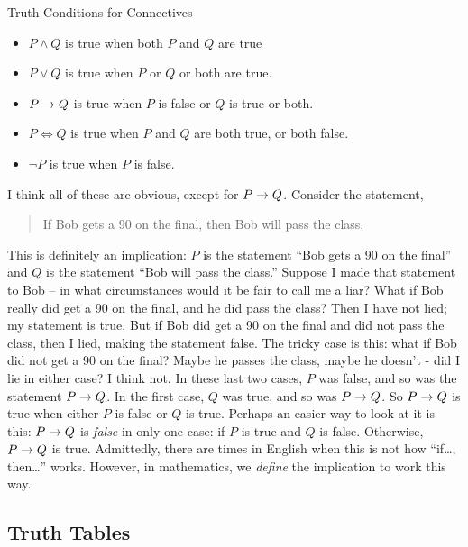 \documentclass[12pt]{article}
\begin{document}
\begin{defbox}{Truth Conditions for Connectives}
\begin{itemize}
 \item $P \wedge Q$ is true when both $P$ and $Q$ are true
\item $P \vee Q$ is true when $P$ or $Q$ or both are true.
\item $P \rightarrow Q$ is true when $P$ is false or $Q$ is true or both.
\item $P \iff Q$ is true when $P$ and $Q$ are both true, or both false.
\item $\neg P$ is true when $P$ is false. 
\end{itemize}
\end{defbox}

I think all of these are obvious, except for $P \rightarrow Q$.  Consider the statement, 
\begin{quotation}If Bob gets a 90 on the final, then Bob will pass the class.\end{quotation}  This is definitely an implication: $P$ is the statement ``Bob gets a 90 on the final'' and $Q$ is the statement ``Bob will pass the class.'' Suppose I made that statement to Bob -- in what circumstances would it be fair to call me a liar?  What if Bob really did get a 90 on the final, and he did pass the class?  Then I have not lied; my statement is true.  But if Bob did get a 90 on the final and did not pass the class, then I lied, making the statement false.  The tricky case is this: what if Bob did not get a 90 on the final?  Maybe he passes the class, maybe he doesn't - did I lie in either case?  I think not.  In these last two cases, $P$ was false, and so was the statement $P \rightarrow Q$.  In the first case, $Q$ was true, and so was $P \rightarrow Q$.  So $P \rightarrow Q$ is true when either $P$ is false or $Q$ is true.  Perhaps an easier way to look at it is this: $P \rightarrow Q$ 
is {\em false} in only one case: if $P$ is true and $Q$ is false.  Otherwise, $P \rightarrow Q$ is true.  Admittedly, there are times in English when this is not how ``if\ldots, then\ldots'' works.  However, in mathematics, we {\em define} the implication to work this way.


\subsection{Truth Tables}
\end{document}
